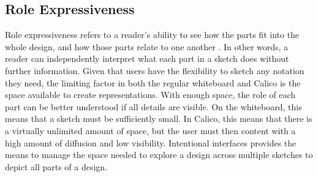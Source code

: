  


\subsection{Role Expressiveness}

Role expressiveness refers to a reader's ability to see how the parts fit into the whole design, and how those parts relate to one another \cite{Petre2013BookChapter}. In other words, a reader can independently interpret what each part in a sketch does without further information. Given that users have the flexibility to sketch any notation they need, the limiting factor in both the regular whiteboard and Calico is the space available to create representations. With enough space, the role of each part can be better understood if all details are visible. On the whiteboard, this means that a sketch must be sufficiently small. In Calico, this means that there is a virtually unlimited amount of space, but the user must then content with a high amount of diffusion and low visibility. Intentional interfaces provides the means to manage the space needed to explore a design across multiple sketches to depict all parts of a design.

